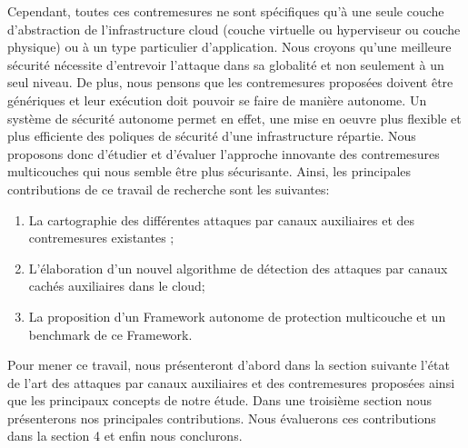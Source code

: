           
\newline{}
\par
Cependant, toutes ces contremesures ne sont spécifiques qu’à une seule couche d’abstraction de l’infrastructure cloud (couche virtuelle ou hyperviseur ou couche physique) ou à un type particulier d’application. Nous croyons qu’une meilleure sécurité nécessite d’entrevoir l’attaque dans sa globalité et non seulement à un seul niveau. De plus, nous pensons que les contremesures proposées doivent  être génériques et leur exécution doit pouvoir se faire de manière autonome. Un système  de sécurité autonome permet en effet, une mise en oeuvre plus flexible et plus efficiente  des poliques de sécurité d'une infrastructure répartie. Nous proposons donc d’étudier et d’évaluer l’approche innovante des contremesures multicouches qui nous semble être plus sécurisante. 
Ainsi, les principales contributions  de ce travail de recherche  sont les suivantes:
\begin{enumerate}
 \item La cartographie des différentes attaques par canaux auxiliaires et des contremesures existantes ;
 \item L’élaboration d’un nouvel algorithme de détection des attaques par canaux cachés auxiliaires dans le cloud;
 \item La proposition d'un Framework autonome de protection multicouche et un benchmark de ce Framework.
\end{enumerate}
  
Pour mener ce travail, nous présenteront d'abord dans la section suivante l’état de l’art des attaques par canaux auxiliaires et des contremesures proposées ainsi que les principaux concepts de notre étude. Dans une troisième section nous présenterons nos principales contributions. Nous  évaluerons ces contributions dans la section 4  et enfin nous conclurons.     


